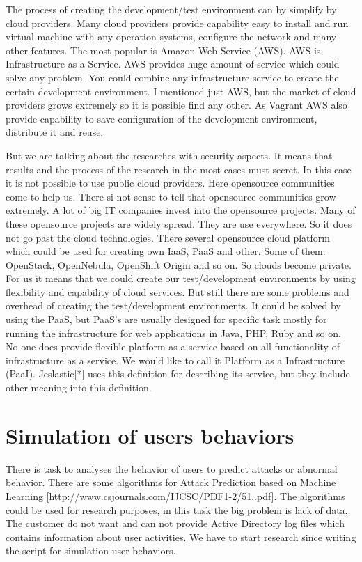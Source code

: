 \documentclass[twoside]{article}
\begin{document}
The process of creating the development/test environment can by simplify by cloud providers. Many cloud providers provide capability easy to install and run virtual machine with any operation systems, configure the network and many other features. The most popular is Amazon Web Service (AWS). AWS is Infrastructure-as-a-Service. AWS provides huge amount of service which could solve any problem.  You could combine any infrastructure service to create the certain development environment. I mentioned just AWS, but the market of cloud providers grows extremely so it is possible find any other. As Vagrant AWS also provide capability to save configuration of the development environment, distribute it and reuse.

But we are talking about the researches with security aspects. It means that results and the process of the research in the most cases must secret. In this case it is not possible to use public cloud providers. Here opensource communities come to help us. There si not sense to tell that opensource communities grow extremely. A lot of big IT companies invest into the opensource projects. Many of these opensource projects are widely spread. They are use everywhere. So it does not go past the cloud technologies. There several opensource cloud platform which could be used for creating own IaaS, PaaS and other. Some of them: OpenStack, OpenNebula,  OpenShift Origin and so on. So clouds become private. For us it means that we could create our test/development environments by using flexibility and capability of cloud services. But still there are some problems and overhead of creating the test/development environments. It could be solved by using the PaaS, but PaaS's are usually designed for specific task mostly for running the infrastructure for web applications in Java, PHP, Ruby and so on. No one does provide flexible platform as a service based on all functionality of infrastructure as a service. We would like to call it Platform as a Infrastructure (PaaI). Jeslastic[*] uses this definition for describing its service, but they include other meaning into this definition.     

        


\section{Simulation of users behaviors}
There is task to analyses the behavior of users to predict attacks or abnormal behavior. There are some algorithms for Attack Prediction based on Machine Learning [http://www.csjournals.com/IJCSC/PDF1-2/51..pdf]. The algorithms could be used for research purposes, in this task the big problem is lack of data. The customer do not want and can not provide Active Directory log files which contains information about user activities. We have to start research since writing the script for simulation user behaviors. 
\end{document}
